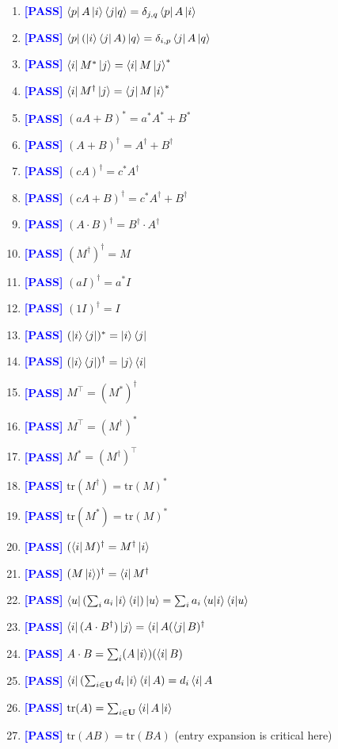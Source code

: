 \documentclass[manuscript, review, timestamp]{acmart}
\newcommand{\tr}{\mathrm{tr}}
\newcommand{\pass}{\textcolor{blue}{\textbf{ [PASS] }}}
\begin{document}
\begin{enumerate}
  \item \pass $\bra{p}A\ket{i}\braket{j|q} = \delta_{j,q}\bra{p}A\ket{i}$
  \item \pass $\bra{p}(\ket{i}\bra{j}A)\ket{q} = \delta_{i, p}\bra{j}A\ket{q}$
  \item \pass $\bra{i}M^*\ket{j} = \bra{i}M\ket{j}^*$
  \item \pass $\bra{i}M^\dagger\ket{j} = \bra{j}M\ket{i}^*$
  \item \pass $(a A + B)^* = a^* A^* + B^*$
  \item \pass $(A+B)^\dagger = A^\dagger + B^\dagger$
  \item \pass $(c A)^\dagger = c^* A^\dagger$
  \item \pass $(c A + B)^\dagger = c^* A^\dagger + B^\dagger$
  \item \pass $(A \cdot B)^\dagger = B^\dagger \cdot A^\dagger$
  \item \pass $(M^\dagger)^\dagger = M$
  \item \pass $(aI)^\dagger = a^* I$
  \item \pass $(1 I)^\dagger = I$
  \item \pass $(\ket{i}\bra{j})^* = \ket{i}\bra{j}$
  \item \pass $(\ket{i}\bra{j})^\dagger = \ket{j}\bra{i}$
  \item \pass $M^\top = (M^*)^\dagger$
  \item \pass $M^\top = (M^\dagger)^*$
  \item \pass $M^* = (M^\dagger)^\top$
  \item \pass $\tr(M^\dagger) = \tr(M)^*$
  \item \pass $\tr(M^*) = \tr(M)^*$
  \item \pass $(\bra{i}M)^\dagger = M^\dagger \ket{i}$
  \item \pass $(M \ket{i})^\dagger = \bra{i} M^\dagger$
  \item \pass $\bra{u} \left( \sum_{i} a_i \ket{i}\bra{i} \right) \ket{u} = \sum_i a_i \braket{u|i}\braket{i|u}$
  \item \pass $\bra{i}(A\cdot B^\dagger)\ket{j} = \bra{i} A (\bra{j}B)^\dagger$
  \item \pass $A \cdot B = \sum_i (A \ket{i})(\bra{i} B)$
  \item \pass $\bra{i}(\sum_{i \in \mathbf{U}} d_i \ket{i}\bra{i} A) = d_i \bra{i} A$
  \item \pass $\tr(A) = \sum_{i \in \mathbf{U}}\bra{i} A \ket{i}$
  \item \pass $\tr(A B) = \tr(B A)$ (entry expansion is critical here)

\end{enumerate}
\end{document}
